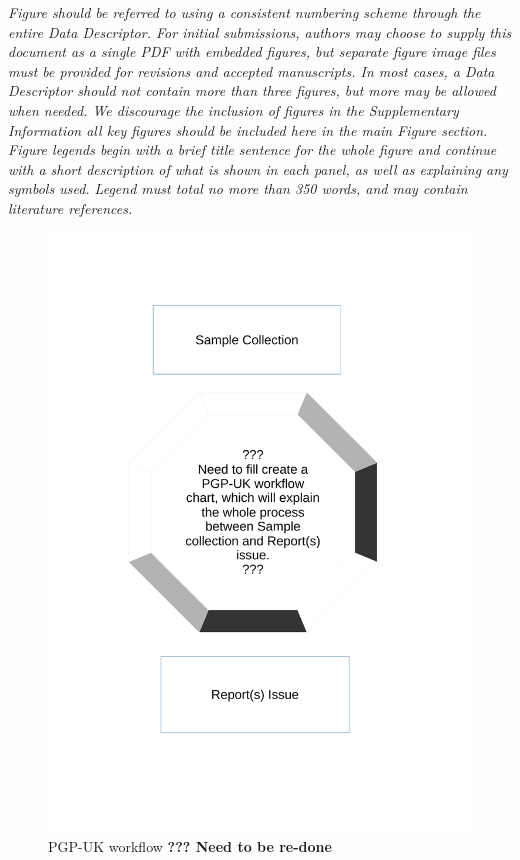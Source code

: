 \documentclass[english]{article}
\begin{document}
\textit{Figure should be referred to using a consistent numbering scheme through
the entire Data Descriptor. For initial submissions, authors may choose
to supply this document as a single PDF with embedded figures, but
separate figure image files must be provided for revisions and accepted
manuscripts. In most cases, a Data Descriptor should not contain more
than three figures, but more may be allowed when needed. We discourage
the inclusion of figures in the Supplementary Information \textendash{}
all key figures should be included here in the main Figure section. 
\\
Figure legends begin with a brief title sentence for the whole figure
and continue with a short description of what is shown in each panel,
as well as explaining any symbols used. Legend must total no more
than 350 words, and may contain literature references.}


\begin{figure}
\includegraphics[width = \textwidth]{img/pgpuk.pdf}
\caption{PGP-UK workflow \newline
\textbf{??? Need to be re-done}}
\label{fig: PGP-UK workflow}
\end{figure}
\end{document}
